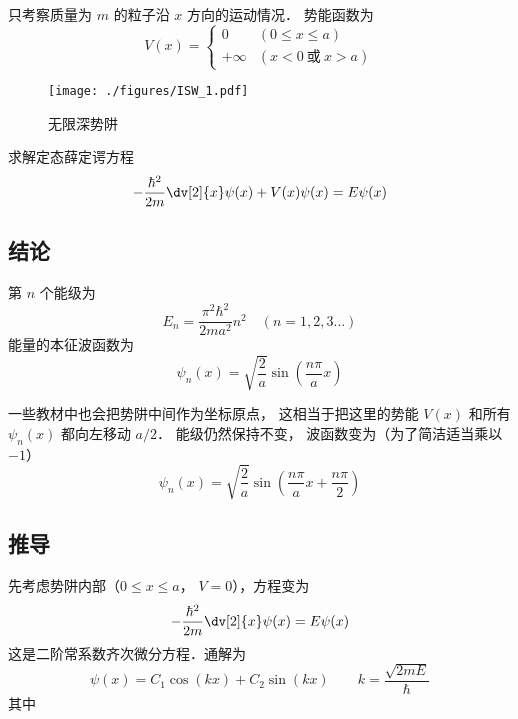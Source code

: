 

只考察质量为 $m$ 的粒子沿 $x$ 方向的运动情况．%
势能函数为
\begin{equation}
V(x) =
\begin{cases}
0 \quad &(0 \leqslant x \leqslant a)\\
+\infty  &(x < 0 \ \text{或}\  x > a)
\end{cases}
\end{equation}

\begin{figure}[ht]
\centering
\texttt{[image: ./figures/ISW\_1.pdf]}
\caption{无限深势阱} \label{ISW_fig1}
\end{figure}
求解定态薛定谔方程 %
\begin{equation}
-\frac{\hbar ^2}{2m} \dv[2]{x} \psi(x) + V(x)\psi(x) = E\psi(x)
\end{equation} 
\subsection{结论} 

第 $n$ 个能级为
\begin{equation}
E_n = \frac{\pi^2 \hbar^2}{2m a^2} n^2 \quad (n = 1,2,3...)
\end{equation}
能量的本征波函数为
\begin{equation}\label{ISW_eq1}
\psi_n(x) = \sqrt{\frac{2}{a}} \sin(\frac{n\pi }{a} x)
\end{equation}

一些教材中也会把势阱中间作为坐标原点， 这相当于把这里的势能 $V(x)$ 和所有 $\psi_n(x)$ 都向左移动 $a/2$． 能级仍然保持不变， 波函数变为（为了简洁适当乘以 $-1$）
\begin{equation}
\psi_n(x) = \sqrt{\frac{2}{a}} \sin(\frac{n\pi }{a} x + \frac{n\pi}{2})
\end{equation}

\subsection{推导} 
先考虑势阱内部（$0 \leqslant x \leqslant a$， $V = 0$），方程变为
\begin{equation}
-\frac{\hbar^2}{2m} \dv[2]{x} \psi(x) = E\psi(x) 
\end{equation}
这是二阶常系数齐次微分方程．通解为
\begin{equation}
\psi(x) = C_1\cos(kx) + C_2 \sin(kx) \qquad
k = \frac{\sqrt{2mE}}{\hbar}
\end{equation} 
其中

